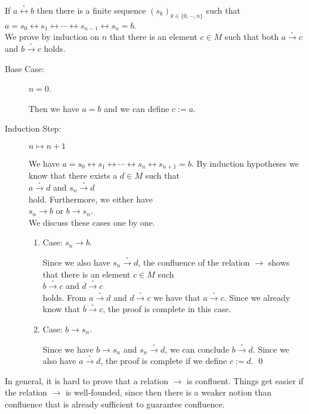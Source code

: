  \proof
If $a \stackrel{_*}{\leftrightarrow} b$ then there is a finite sequence $(s_k)_{k\in \{0,\cdots,n\}}$ such that
\\[0.2cm]
\hspace*{1.3cm}
$a = s_0 \leftrightarrow s_1 \leftrightarrow \cdots \leftrightarrow s_{n-1} \leftrightarrow s_n = b$.
\\[0.2cm]
We prove by induction on $n$ that there is an element $c \in M$ such that both $a \stackrel{_*}{\rightarrow} c$ and
$b \stackrel{_*}{\rightarrow} c$ holds.
\begin{description}
\item[Base Case:] $n = 0$.
  
      Then we have $a = b$ and we can define $c := a$.
\item[Induction Step:] $n \mapsto n+1$
      
      We have $a = s_0 \leftrightarrow s_1 \leftrightarrow \cdots \leftrightarrow s_{n} \leftrightarrow s_{n+1} = b$.
      By induction hypotheses we know that there exists a $d \in M$ such that
      \\[0.2cm]
      \hspace*{1.3cm}
      $a \stackrel{_*}{\rightarrow} d$ \quad and \quad $s_{n} \stackrel{_*}{\rightarrow} d$ 
      \\[0.2cm]
      hold.  Furthermore, we either have
      \\[0.2cm]
      \hspace*{1.3cm}
      $s_{n} \rightarrow b$ \quad or \quad $b \rightarrow s_{n}$.
      \\[0.2cm]
      We discuss these cases one by one.
      \begin{enumerate}
      \item Case: $s_n \rightarrow b$.

        Since we also have $s_{n} \stackrel{_*}{\rightarrow} d$, the confluence of the relation $\rightarrow$ shows that
        there is an element $c \in M$ such 
        \\[0.2cm]
        \hspace*{1.3cm}
        $b \stackrel{_*}{\rightarrow} c$ \quad and \quad $d \stackrel{_*}{\rightarrow} c$ 
        \\[0.2cm]
        holds.  From $a \stackrel{_*}{\rightarrow} d$ and $d \stackrel{_*}{\rightarrow} c$ we have that $a \stackrel{_*}{\rightarrow} c$.  Since we already
        know that $b \stackrel{_*}{\rightarrow} c$, the proof is complete in this case. 
      \item Case: $b \rightarrow s_n$.

        Since we have $b \rightarrow s_n$ and $s_n \stackrel{_*}{\rightarrow} d$, we can conclude
        $b \stackrel{_*}{\rightarrow} d$.  Since we also have $a \stackrel{_*}{\rightarrow} d$, the proof is
        complete if we define $c := d$.  \qed
      \end{enumerate}
\end{description}
In general, it is hard to prove that a relation $\rightarrow$ is confluent.  Things get easier if the relation
$\rightarrow$ is well-founded, since then there is a weaker notion than confluence that is already sufficient
to guarantee confluence.

